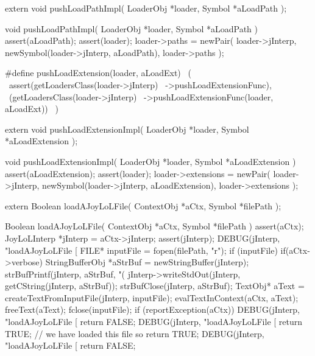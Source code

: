\startCHeader
extern void pushLoadPathImpl(
  LoaderObj *loader,
  Symbol    *aLoadPath
);
\stopCHeader
{}

\startCCode
void pushLoadPathImpl(
  LoaderObj *loader,
  Symbol    *aLoadPath
) {
  assert(aLoadPath);
  assert(loader);
  loader->paths =
    newPair(
      loader->jInterp,
      newSymbol(loader->jInterp, aLoadPath),
      loader->paths
    );
}
\stopCCode

\startCHeader
#define pushLoadExtension(loader, aLoadExt)       \
  (                                               \
    assert(getLoadersClass(loader->jInterp)       \
      ->pushLoadExtensionFunc),                   \
    (getLoadersClass(loader->jInterp)             \
      ->pushLoadExtensionFunc(loader, aLoadExt))  \
  )
\stopCHeader

\setCHeaderStream{private}
\startCHeader
extern void pushLoadExtensionImpl(
  LoaderObj *loader,
  Symbol    *aLoadExtension
);
\stopCHeader
{}

\startCCode
void pushLoadExtensionImpl(
  LoaderObj *loader,
  Symbol    *aLoadExtension
) {
  assert(aLoadExtension);
  assert(loader);
  loader->extensions =
    newPair(
      loader->jInterp, 
      newSymbol(loader->jInterp, aLoadExtension),
      loader->extensions
    );
}
\stopCCode

\setCHeaderStream{private}
\startCHeader
extern Boolean loadAJoyLoLFile(
  ContextObj *aCtx,
  Symbol     *filePath
);
\stopCHeader
{}

\startCCode
Boolean loadAJoyLoLFile(
  ContextObj *aCtx,
  Symbol     *filePath
) {
  assert(aCtx);
  JoyLoLInterp *jInterp = aCtx->jInterp;
  assert(jInterp);
  DEBUG(jInterp, "loadAJoyLoLFile [%
  FILE* inputFile = fopen(filePath, "r");
  if (inputFile) {
    if(aCtx->verbose) {
      StringBufferObj *aStrBuf = 
        newStringBuffer(jInterp);      
      strBufPrintf(jInterp, aStrBuf, "(%
      jInterp->writeStdOut(jInterp, getCString(jInterp, aStrBuf));
      strBufClose(jInterp, aStrBuf);
    }
    TextObj* aText =
      createTextFromInputFile(jInterp, inputFile);
    evalTextInContext(aCtx, aText);
    freeText(aText);
    fclose(inputFile);
    if (reportException(aCtx)) {
      DEBUG(jInterp, "loadAJoyLoLFile [%
      return FALSE;
    }
    DEBUG(jInterp, "loadAJoyLoLFile [%
    return TRUE; // we have loaded this file so return TRUE;
  }
  DEBUG(jInterp, "loadAJoyLoLFile [%
  return FALSE;
}
\stopCCode

